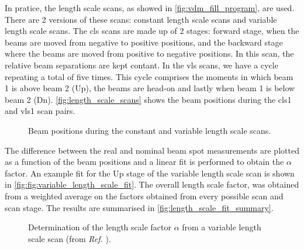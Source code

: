 In pratice, the length scale scans, as showed in \autoref{fig:vdm_fill_program}, are used. There are 2 versions of these scans: constant length scale scans and variable length scale scans. The cls scans are made up of 2 stages: forward stage, when the beams are moved from negative to positive positions, and the backward stage where the beams are moved from positive to negative positions. In this scan, the relative beam separations are kept contant. In the vls scans, we have a cycle repeating a total of five times. This cycle comprises the moments in which beam 1 is above beam 2 (Up), the beams are head-on and lastly when beam 1 is below beam 2 (Dn). \autoref{fig:length_scale_scans} shows the beam positions during the cls1 and vls1 scan pairs.

\begin{figure}[!htb]
	\centering
	\caption[Beam positions in length scale scans]{Beam positions during the constant and variable length scale scans.}
	\label{fig:length_scale_scans}
\end{figure}

The difference between the real and nominal beam spot measurements are plotted as a function of the beam positions and a linear fit is performed to obtain the $\alpha$ factor. An example fit for the Up stage of the variable length scale scan is shown in \autoref{fig:fig:variable_length_scale_fit}. The overall length scale factor, was obtained from a weighted average on the factors obtained from every possible scan and scan stage. The results are summarised in \autoref{fig:length_scale_fit_summary}.

\begin{figure}[!htb]
	\centering
	\caption[Length scale factor determination]{Determination of the length scale factor $\alpha$ from a variable length scale scan (from \textit{Ref.} \cite{CMS-DP-2024-068}).}
	\label{fig:fig:variable_length_scale_fit}
\end{figure}

